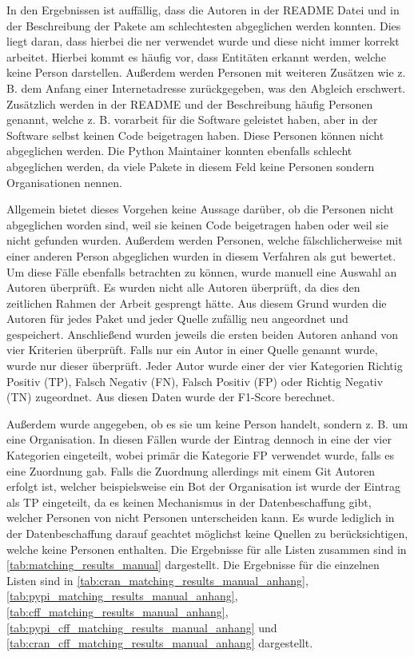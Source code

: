 In den Ergebnissen ist auffällig, dass die Autoren in der README Datei und in der Beschreibung der Pakete am schlechtesten abgeglichen werden konnten.
Dies liegt daran, dass hierbei die \gls{ner} verwendet wurde und diese nicht immer korrekt arbeitet.
Hierbei kommt es häufig vor, dass Entitäten erkannt werden, welche keine Person darstellen.
Außerdem werden Personen mit weiteren Zusätzen wie z. B. dem Anfang einer Internetadresse zurückgegeben, was den Abgleich erschwert.
Zusätzlich werden in der README und der Beschreibung häufig Personen genannt, welche z. B. vorarbeit für die Software geleistet haben, aber in der Software selbst keinen Code beigetragen haben.
Diese Personen können nicht abgeglichen werden.
Die Python Maintainer konnten ebenfalls schlecht abgeglichen werden, da viele Pakete in diesem Feld keine Personen sondern Organisationen nennen.

Allgemein bietet dieses Vorgehen keine Aussage darüber, ob die Personen nicht abgeglichen worden sind, weil sie keinen Code beigetragen haben oder weil sie nicht gefunden wurden.
Außerdem werden Personen, welche fälschlicherweise mit einer anderen Person abgeglichen wurden in diesem Verfahren als gut bewertet.
Um diese Fälle ebenfalls betrachten zu können, wurde manuell eine Auswahl an Autoren überprüft.
Es wurden nicht alle Autoren überprüft, da dies den zeitlichen Rahmen der Arbeit gesprengt hätte.
Aus diesem Grund wurden die Autoren für jedes Paket und jeder Quelle zufällig neu angeordnet und gespeichert.
Anschließend wurden jeweils die ersten beiden Autoren anhand von vier Kriterien überprüft.
Falls nur ein Autor in einer Quelle genannt wurde, wurde nur dieser überprüft.
Jeder Autor wurde einer der vier Kategorien \glqq Richtig Positiv (TP)\grqq{}, \glqq Falsch Negativ (FN)\grqq{}, \glqq Falsch Positiv (FP)\grqq{} oder \glqq Richtig Negativ (TN)\grqq{} zugeordnet.
Aus diesen Daten wurde der F1-Score berechnet.

Außerdem wurde angegeben, ob es sie um keine Person handelt, sondern z. B. um eine Organisation.
In diesen Fällen wurde der Eintrag dennoch in eine der vier Kategorien eingeteilt, wobei primär die Kategorie FP verwendet wurde, falls es eine Zuordnung gab.
Falls die Zuordnung allerdings mit einem Git Autoren erfolgt ist, welcher beispielsweise ein Bot der Organisation ist wurde der Eintrag als TP eingeteilt, da es keinen Mechanismus in der Datenbeschaffung gibt, welcher Personen von nicht Personen unterscheiden kann.
Es wurde lediglich in der Datenbeschaffung darauf geachtet möglichst keine Quellen zu berücksichtigen, welche keine Personen enthalten.
Die Ergebnisse für alle Listen zusammen sind in \autoref{tab:matching_results_manual} dargestellt.
Die Ergebnisse für die einzelnen Listen sind in \autoref{tab:cran_matching_results_manual_anhang}, \autoref{tab:pypi_matching_results_manual_anhang}, \autoref{tab:cff_matching_results_manual_anhang}, \autoref{tab:pypi_cff_matching_results_manual_anhang} und \autoref{tab:cran_cff_matching_results_manual_anhang} dargestellt.

